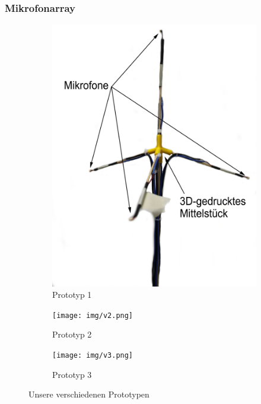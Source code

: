 \subsubsection{Mikrofonarray}
\begin{figure}[H]
    \centering
    \begin{subfigure}[b]{0.3\textwidth}
        \includegraphics[width=\textwidth]{img/v1.png}
        \caption{Prototyp 1\label{fig:prototyp1}}
    \end{subfigure}
    \hfill
    \begin{subfigure}[b]{0.3\textwidth}
        \texttt{[image: img/v2.png]}
        \caption{Prototyp 2\label{fig:prototyp2}}
    \end{subfigure}
    \hfill
    \begin{subfigure}[b]{0.3\textwidth}
        \texttt{[image: img/v3.png]}
        \caption{Prototyp 3\label{fig:prototyp3}}
    \end{subfigure}
    \caption{Unsere verschiedenen Prototypen\label{tet}}
\end{figure}
